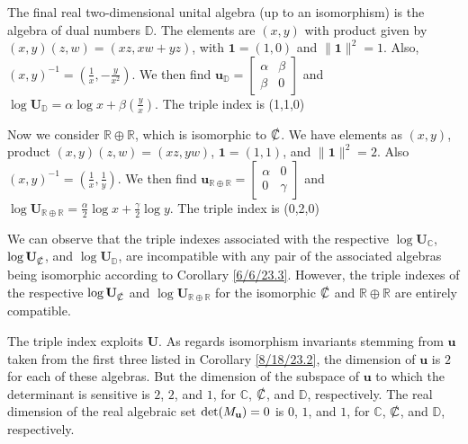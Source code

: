 \documentclass{amsart}
\numberwithin{equation}{section}
\theoremstyle{definition}
\numberwithin{theorem}{section}
\begin{document}
The final real two-dimensional unital algebra (up to an isomorphism) is the algebra of dual numbers $\mathbb{D}$.  The elements are $(x,y)$ with product given by $(x,y)(z,w) = (xz,xw+yz)$, with $\mathbf{1}=(1,0)$ and $\|\mathbf{1}\|^2 = 1$. Also, $(x,y)^{-1} = (\frac{1}{x},-\frac{y}{x^2})$.  We then find $\mathbf{u}_\mathbb{D} = \left[\begin{array}{ccc}
 \alpha & \beta   \\ 
 \beta & 0    
\end{array}\right]$ and $\log  \mathbf{U}_{\mathbb{D}} = \alpha\log x + \beta\left(\frac{y}{x}\right)$. The triple index is (1,1,0)

Now we consider $\mathbb{R}\oplus\mathbb{R}$, which is isomorphic to $\slashed{\mathbb{C}}$.  We have elements as $(x,y)$, product $(x,y)(z,w) = (xz,yw)$, $\mathbf{1}=(1,1)$, and $\|\mathbf{1}\|^2 = 2$.  Also $(x,y)^{-1} = (\frac{1}{x},\frac{1}{y})$.  We then find $\mathbf{u}_{\mathbb{R}\oplus\mathbb{R}} = \left[\begin{array}{ccc}
 \alpha & 0   \\ 
 0 & \gamma    
\end{array}\right]$ and $\log  \mathbf{U}_{\mathbb{R}\oplus\mathbb{R}} = \frac{\alpha}{2}\log x + \frac{\gamma}{2}\log y$.  The triple index is (0,2,0)

We can observe that the triple indexes associated with the respective $\log \mathbf{U}_{\mathbb{C}}$, $\log \mathbf{U}_{\slashed{\mathbb{C}}}$, and $\log \mathbf{U}_{\mathbb{D}}$, are incompatible with any pair of the associated algebras being isomorphic according to Corollary \ref{6/6/23.3}.  However, the triple indexes of the respective $\log \mathbf{U}_{\slashed{\mathbb{C}}}$ and $\log \mathbf{U}_{\mathbb{R}\oplus\mathbb{R}}$  for the isomorphic $\slashed{\mathbb{C}}$ and $\mathbb{R}\oplus\mathbb{R}$ are entirely compatible.  

The triple index exploits $\mathbf{U}$.   As regards isomorphism invariants stemming from $\mathbf{u}$ taken from the first three listed in Corollary \ref{8/18/23.2}, the dimension of $\mathbf{u}$ is $2$ for each of these algebras.  But the dimension of the subspace of $\mathbf{u}$ to which the determinant is sensitive is $2$, $2$, and $1$, for $\mathbb{C}$, $\slashed{\mathbb{C}}$, and $\mathbb{D}$, respectively.  The real dimension of the real algebraic set ${\rm det}(M_{\mathbf{u}}) = 0$ is $0$, $1$, and $1$, for $\mathbb{C}$, $\slashed{\mathbb{C}}$, and $\mathbb{D}$, respectively.   
  
\end{document}
